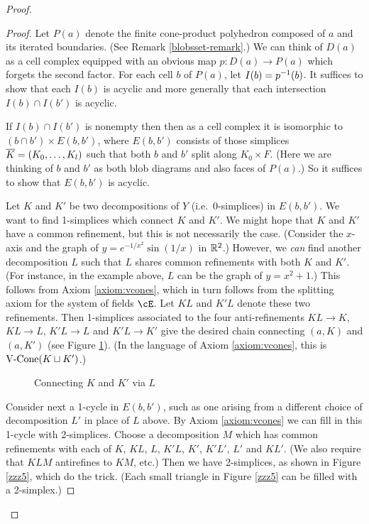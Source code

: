 \begin{proof}
\begin{proof}
Let $P(a)$ denote the finite cone-product polyhedron composed of $a$ and its iterated boundaries.
(See Remark \ref{blobsset-remark}.)
We can think of $D(a)$ as a cell complex equipped with an obvious
map $p: D(a) \to P(a)$ which forgets the second factor.
For each cell $b$ of $P(a)$, let $I(b) = p^{-1}(b)$.
It suffices to show that each $I(b)$ is acyclic and more generally that
each intersection $I(b)\cap I(b')$ is acyclic.

If $I(b)\cap I(b')$ is nonempty then then as a cell complex it is isomorphic to
$(b\cap b') \times E(b, b')$, where $E(b, b')$ consists of those simplices
$\overline{K} = (K_0,\ldots,K_l)$ such that both $b$ and $b'$ split along $K_0\times F$.
(Here we are thinking of $b$ and $b'$ as both blob diagrams and also faces of $P(a)$.)
So it suffices to show that $E(b, b')$ is acyclic.

Let $K$ and $K'$ be two decompositions of $Y$ (i.e.\ 0-simplices) in $E(b, b')$.
We want to find 1-simplices which connect $K$ and $K'$.
We might hope that $K$ and $K'$ have a common refinement, but this is not necessarily
the case.
(Consider the $x$-axis and the graph of $y = e^{-1/x^2} \sin(1/x)$ in $\mathbb{R}^2$.)
However, we {\it can} find another decomposition $L$ such that $L$ shares common
refinements with both $K$ and $K'$. (For instance, in the example above, $L$ can be the graph of $y=x^2+1$.)
This follows from Axiom \ref{axiom:vcones}, which in turn follows from the
splitting axiom for the system of fields $\cE$.
Let $KL$ and $K'L$ denote these two refinements.
Then 1-simplices associated to the four anti-refinements
$KL\to K$, $KL\to L$, $K'L\to L$ and $K'L\to K'$
give the desired chain connecting $(a, K)$ and $(a, K')$
(see Figure \ref{zzz4}).
(In the language of Axiom \ref{axiom:vcones}, this is $\text{V-Cone}(K \sqcup K')$.)

\begin{figure}[t] \centering
{}
\caption{Connecting $K$ and $K'$ via $L$}
\label{zzz4}
\end{figure}

Consider next a 1-cycle in $E(b, b')$, such as one arising from
a different choice of decomposition $L'$ in place of $L$ above.
By Axiom \ref{axiom:vcones} we can fill in this 1-cycle with 2-simplices.
Choose a decomposition $M$ which has common refinements with each of 
$K$, $KL$, $L$, $K'L$, $K'$, $K'L'$, $L'$ and $KL'$.
(We also require that $KLM$ antirefines to $KM$, etc.)
Then we have 2-simplices, as shown in Figure \ref{zzz5}, which do the trick.
(Each small triangle in Figure \ref{zzz5} can be filled with a 2-simplex.)


\end{proof}
\end{proof}
